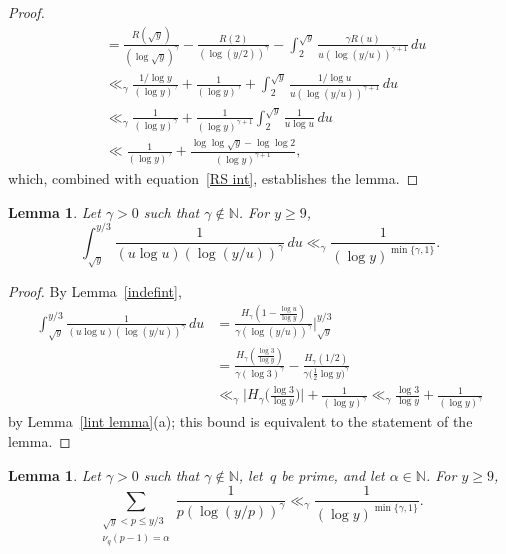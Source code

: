\documentclass[12pt,reqno]{amsart}
\newtheorem{lemma}[theorem]{Lemma}
\theoremstyle{definition}
\newcommand{\N}{{\mathbb N}}
\begin{document}
\begin{proof}
\begin{align*}
&= \frac{R(\sqrt y)}{(\log\sqrt y)^\gamma} - \frac{R(2)}{(\log(y/2))^\gamma} - \int_2^{\sqrt y} \frac{\gamma R(u)}{u(\log(y/u))^{\gamma+1}} \,du \\
&\ll_\gamma \frac{1/\log y}{(\log y)^\gamma} + \frac1{(\log y)^\gamma} + \int_2^{\sqrt y} \frac{1/\log u}{u(\log(y/u))^{\gamma+1}} \,du \\
&\ll_\gamma \frac1{(\log y)^\gamma} + \frac1{(\log y)^{\gamma+1}} \int_2^{\sqrt y} \frac1{u\log u} \,du \\
&\ll \frac1{(\log y)^\gamma} + \frac{\log\log \sqrt y- \log\log 2}{(\log y)^{\gamma+1}},
\end{align*}
which, combined with equation~\eqref{RS int}, establishes the lemma.
\end{proof}

\begin{lemma} \label{uint}
Let $\gamma>0$ such that $\gamma\not\in\N$. For $y\ge 9$,
\[
\int_{\sqrt y}^{y/3} \frac 1{(u\log u)(\log(y/u))^\gamma} \,du \ll_\gamma \frac 1{(\log y)^{\min\{\gamma,1\}}}.
\]
\end{lemma}

\begin{proof}
By Lemma~\ref{indefint},
\begin{align*}
\int_{\sqrt y}^{y/3} \frac 1{(u\log u)(\log(y/u))^\gamma} \,du &= \frac{H_\gamma(1-\frac{\log u}{\log y})}{\gamma(\log(y/u))^\gamma}\bigg|_{\sqrt y}^{y/3} \\
&= \frac{H_\gamma(\frac{\log3}{\log y})}{\gamma(\log3)^\gamma} - \frac{H_\gamma(1/2)}{\gamma\big( \frac 12 \log y\big)^\gamma} \\
&\ll_\gamma \bigg| H_\gamma\bigg( \frac{\log3}{\log y} \bigg) \bigg| + \frac1{(\log y)^\gamma} \ll_\gamma \frac{\log3}{\log y} + \frac1{(\log y)^\gamma}
\end{align*}
by Lemma~\ref{lint lemma}(a); this bound is equivalent to the statement of the lemma.
\end{proof}

\begin{lemma} \label{usum}
Let $\gamma>0$ such that $\gamma\not\in\N$, let~$q$ be prime, and let $\alpha\in\N$. For $y\ge9$,
\[
\sum_{\substack{\sqrt y<p\le y/3\\ \nu_q(p-1)=\alpha}} \frac1{p(\log(y/p))^\gamma} \ll_\gamma \frac1{(\log y)^{\min\{\gamma,1\}}}.
\]
\end{lemma}
\end{document}
